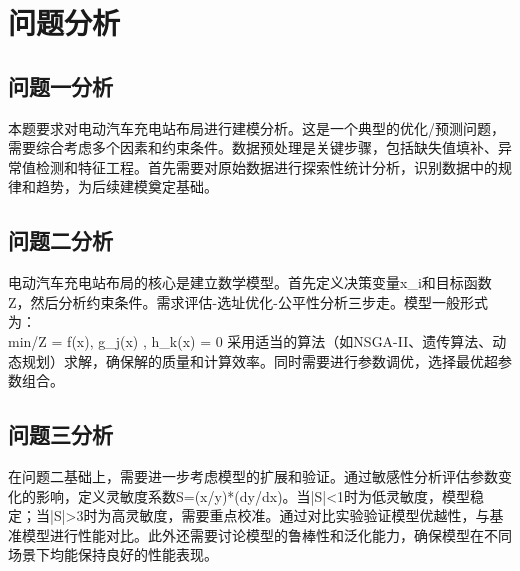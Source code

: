 \newpage
\section{问题分析}

\subsection{问题一分析}
本题要求对电动汽车充电站布局进行建模分析。这是一个典型的优化/预测问题，需要综合考虑多个因素和约束条件。数据预处理是关键步骤，包括缺失值填补、异常值检测和特征工程。首先需要对原始数据进行探索性统计分析，识别数据中的规律和趋势，为后续建模奠定基础。

\subsection{问题二分析}
电动汽车充电站布局的核心是建立数学模型。首先定义决策变量x_i和目标函数Z，然后分析约束条件。需求评估-选址优化-公平性分析三步走。模型一般形式为：
\\min/\max \quad Z = f(x), \quad {} \quad g_j(x) , \; h_k(x) = 0
采用适当的算法（如NSGA-II、遗传算法、动态规划）求解，确保解的质量和计算效率。同时需要进行参数调优，选择最优超参数组合。

\subsection{问题三分析}
在问题二基础上，需要进一步考虑模型的扩展和验证。通过敏感性分析评估参数变化的影响，定义灵敏度系数S=(x/y)*(dy/dx)。当|S|<1时为低灵敏度，模型稳定；当|S|>3时为高灵敏度，需要重点校准。通过对比实验验证模型优越性，与基准模型进行性能对比。此外还需要讨论模型的鲁棒性和泛化能力，确保模型在不同场景下均能保持良好的性能表现。